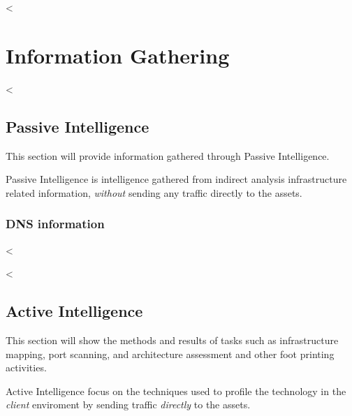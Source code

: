 

<%


\chapter{Information Gathering}\label{ch:infogath}

  <%

  \section {Passive Intelligence}\label{sec:passiveint}

    This section will provide information gathered through Passive Intelligence.

    Passive Intelligence is intelligence gathered from indirect analysis
    infrastructure related information, \textit{without} sending any traffic
    directly to the assets.

    \subsection{DNS information}\label{sub:dnsinfo}

      \begin{itemize}
        <%
          \item \textbf{<%
            \begin{verbatim}
<%= dns_scan[:result] %>
            \end{verbatim}
        <%
      \end{itemize}

  <%

  <%

  \section {Active Intelligence}\label{sec:activeint}

    This section will show the methods and results of tasks such as
    infrastructure mapping, port scanning, and architecture assessment and other
    foot printing activities.

    Active Intelligence focus on the techniques used to profile the technology
    in the \textit{client} enviroment by sending traffic \textit{directly} to
    the assets.


